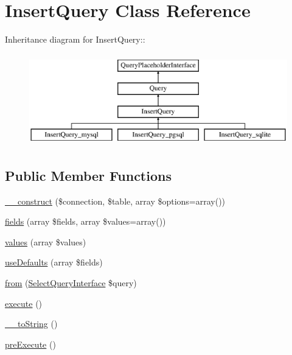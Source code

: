\hypertarget{classInsertQuery}{
\section{InsertQuery Class Reference}
\label{classInsertQuery}
}
Inheritance diagram for InsertQuery::\begin{figure}[H]
\begin{center}
\leavevmode
\includegraphics[height=4cm]{classInsertQuery}
\end{center}
\end{figure}
\subsection*{Public Member Functions}
\begin{DoxyCompactItemize}
\item 
\hyperlink{classInsertQuery_a2a5dd9afb005a1f14877a18dd3c3429d}{\_\-\_\-construct} (\$connection, \$table, array \$options=array())
\item 
\hyperlink{classInsertQuery_a80eebdf6db8f9b25998d68217fb9ba69}{fields} (array \$fields, array \$values=array())
\item 
\hyperlink{classInsertQuery_a7b248332d48bde48cfef6e18b1b6fb7c}{values} (array \$values)
\item 
\hyperlink{classInsertQuery_a5d584ac1930b6a791e0c5701d556cb65}{useDefaults} (array \$fields)
\item 
\hyperlink{classInsertQuery_ad9ed6614e8443cfc515ef8b3e8031894}{from} (\hyperlink{interfaceSelectQueryInterface}{SelectQueryInterface} \$query)
\item 
\hyperlink{classInsertQuery_a9bcd2f989e2ae0173bd6f58b6ede12fc}{execute} ()
\item 
\hyperlink{classInsertQuery_a996fb0719632b8861284683c1ff711fa}{\_\-\_\-toString} ()
\item 
\hyperlink{classInsertQuery_ae33303d3a1d2edf20a7d3f762a627a0a}{preExecute} ()
\end{DoxyCompactItemize}
